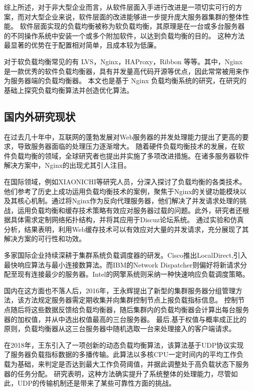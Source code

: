 综上所述，对于非大型企业而言，从软件层面入手进行改进是一项切实可行的方案，而对大型企业来说，软件层面的改进能够进一步提升庞大服务器集群的整体性能。
软件层面实现的负载均衡被称为软负载均衡，其原理是在一台或多台服务器的不同操作系统中安装一个或多个附加软件，以达到负载均衡的目的。
这种方法最显著的优势在于配置相对简单，且成本较为低廉。

对于软负载均衡常见的有 LVS\cite{lijp}，Nginx\cite{Zepeng}，HAProxy\cite{li2019dynamic}，Ribbon 等等。其中，Nginx 是一款优秀的软件负载均衡器，具有并发量高代码开源等优点，因此常常被用来作为服务器端的负载均衡器。
本文也是基于 Nginx 负载均衡系统的研究，在研究的基础上探究负载均衡算法并创造优化算法。

\subsection{国内外研究现状}

在过去几十年中，互联网的蓬勃发展对Web服务器的并发处理能力提出了更高的要求，导致服务器面临的处理压力逐渐增大。
随着硬件负载均衡技术的发展，在软件负载均衡的领域，全球研究者也提出并实施了多项改进措施。在诸多服务器软件解决方案中，Nginx的出现尤其引人注目。

在国际领域，例如XIAONICHI等研究人员\cite{chi2012web}，分深入探讨了负载均衡的各类技术。他们参考了历史上成功运用负载均衡技术的案例，聚焦于Nginx的关键功能模块以及其核心机制。通过将Nginx作为反向代理服务器，他们解决了并发请求处理的挑战，运用负载均衡和缓存技术策略有效应对服务器过载的问题。此外，研究者还根据具体需求定制网络拓扑结构，并将其应用于Discuz论坛系统。
通过实验和仿真分析，结果表明，利用Web缓存技术可以有效应对大量的并发请求，充分展现了其解决方案的可行性和功效。

多家国际企业持续深耕于集群系统负载调度器的研发。Cisco推出LocalDirect,引入最快响应算法与最小连接数算法。而IBM的Network Dispatcher则偏好将新请求分配至现有连接最少的服务器。Intel的网擎系统则采纳一种快速响应负载调度策略\cite{张淇2020服务器集群负载均衡算法在商务系统中的研究与应用}。

国内在这方面也不落人后，2016年，王永辉提出了新型的集群服务器分组管理方法，该方法规定服务器需定期收集并向集群控制节点上报负载指标信息。
控制节点随后将这些数据反馈给负载均衡器，随后集群内的负载均衡器会计算出每台服务器的加权值，并从中选出权值最高的三台服务器。
最后,基于权值与概率成正比的原则，负载均衡器从这三台服务器中随机选取一台来处理接入的客户端请求\cite{王永辉2015基于}。

在2018年，王东引入了一项创新的动态负载均衡算法，该算法基于UDP协议实现了服务器负载指标数据的多播传输\cite{王东2018动态反馈负载均衡策略的研究}。此算法以多核CPU一定时间内的平均工作负载为基础，来判定是否达到最大工作负荷阈值，并据此调整处于高负载状态下服务器的任务分配。
研究表明，这种方法确实提升了系统整体的处理能力，尽管如此，UDP的传输机制还是带来了某些可靠性方面的挑战。

